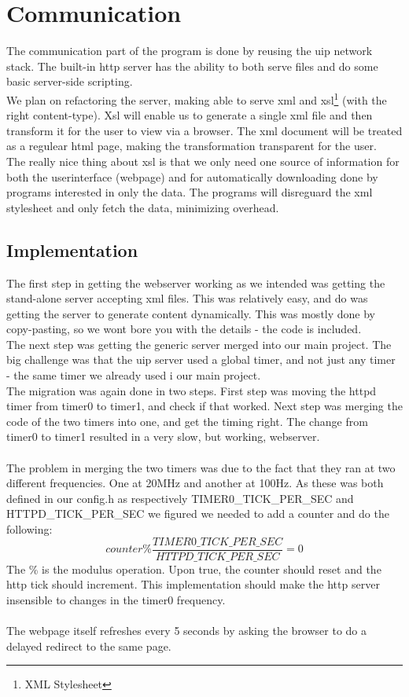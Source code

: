 \section{Communication}
The communication part of the program is done by reusing the uip network stack. The built-in http server has the ability to both serve files and do some basic server-side scripting. \\
We plan on refactoring the server, making able to serve xml and xsl\footnote{XML Stylesheet} (with the right content-type). Xsl will enable us to generate a single xml file and then transform it for the user to view via a browser. The xml document will be treated as a regulear html page, making the transformation transparent for the user. \\
The really nice thing about xsl is that we only need one source of information for both the userinterface (webpage) and for automatically downloading done by programs interested in only the data. The programs will disreguard the xml stylesheet and only fetch the data, minimizing overhead.
\subsection{Implementation}
The first step in getting the webserver working as we intended was getting the stand-alone server accepting xml files. This was relatively easy, and do was getting the server to generate content dynamically. This was mostly done by copy-pasting, so we wont bore you with the details - the code is included.\\
The next step was getting the generic server merged into our main project. The big challenge was that the uip server used a global timer, and not just any timer - the same timer we already used i our main project.\\
The migration was again done in two steps. First step was moving the httpd timer from timer0 to timer1, and check if that worked. Next step was merging the code of the two timers into one, and get the timing right. The change from timer0 to timer1 resulted in a very slow, but working, webserver.\\\\
The problem in merging the two timers was due to the fact that they ran at two different frequencies. One at 20MHz and another at 100Hz. As these was both defined in our config.h as respectively TIMER0\_TICK\_PER\_SEC and HTTPD\_TICK\_PER\_SEC we figured we needed to add a counter and do the following:
\begin{equation}
  counter \% \frac{TIMER0\_TICK\_PER\_SEC}{HTTPD\_TICK\_PER\_SEC} = 0
\end{equation}
The \% is the modulus operation. Upon true, the counter should reset and the http tick should increment. This implementation should make the http server insensible to changes in the timer0 frequency.\\\\
The webpage itself refreshes every 5 seconds by asking the browser to do a delayed redirect to the same page.

